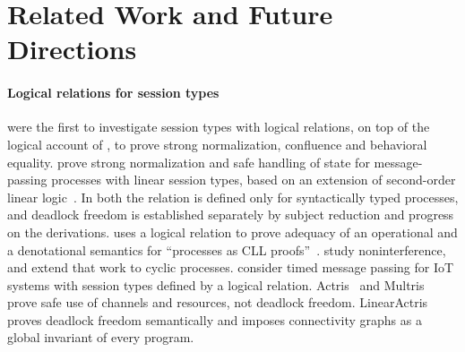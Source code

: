 \section{Related Work and Future Directions}
\label{sec:relatedWork}

\paragraph{Logical relations for session types}
\citet{DBLP:journals/iandc/PerezCPT14} were the first to investigate
session types with logical relations, on top of the logical account of
\citet{DBLP:conf/concur/CairesP10}, to prove strong normalization,
confluence and behavioral equality.
\citet{conf/esop/RochaC23} prove strong normalization and safe handling
of state for message-passing processes with linear session types, based
on an extension of second-order linear
logic~\cite{DBLP:journals/tcs/Girard87}.
In both \cite{DBLP:journals/iandc/PerezCPT14,conf/esop/RochaC23} the
relation is defined only for syntactically typed processes, and deadlock
freedom is established separately by subject reduction and progress on
the derivations.
\citet{conf/esop/Atkey17} uses a logical relation to prove adequacy of
an operational and a denotational semantics for ``processes as CLL
proofs''~\cite{conf/icfp/Wadler12}.
\citet{DBLP:conf/lics/DerakhshanBJ21} study noninterference, and
\citet{DBLP:conf/ecoop/0001DB24} extend that work to cyclic processes.
\citet{DBLP:journals/pacmpl/YaoICBZ25} consider timed message passing
for IoT systems with session types defined by a logical relation.
Actris~\cite{DBLP:journals/lmcs/HinrichsenBK22,DBLP:conf/cpp/HinrichsenLKB21,DBLP:journals/pacmpl/HinrichsenBK20}
and Multris~\cite{HinrichsenJK24} prove safe use of channels and
resources, not deadlock freedom.
LinearActris~\cite{JacobsHK24} proves deadlock freedom semantically and
imposes connectivity graphs
\cite{DBLP:journals/pacmpl/JacobsBK22,DBLP:journals/pacmpl/JacobsB23} as
a global invariant of every program.

